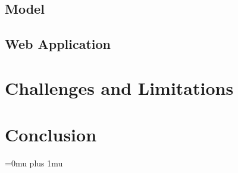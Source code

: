 \documentclass[a4paper, oneside, 11pt]{article}
\begin{document}
\begin{multicols*}{2}
  \subsection{Model}


  \subsection{Web Application}
  


  
  \section{Challenges and Limitations}






  \section{Conclusion}
  \lipsum[1]



  \newpage


  \Urlmuskip=0mu plus 1mu\relax
  
  

\end{multicols*}
\end{document}
